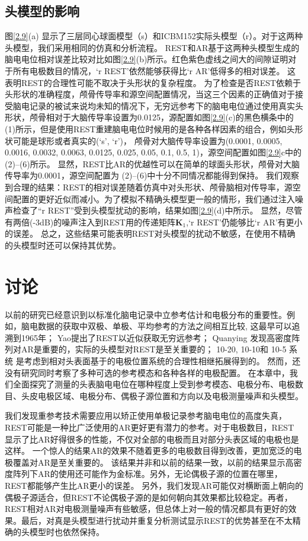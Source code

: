 \subsection{头模型的影响}
\label{ch3.7}
图\ref{2.9}(a) 显示了三层同心球面模型（s）和ICBM152实际头模型（r）。对于这两种头模型，我们采用相同的仿真和分析流程。 REST和AR基于这两种头模型生成的脑电电位相对误差比较对比如图\ref{2.9}(b)所示。红色紫色虚线之间大的间隙证明对于所有电极数目的情况，‘r REST’依然能够获得比‘r AR’低得多的相对误差。
这表明REST的合理性可能不取决于头形状的复杂程度。 为了检查是否REST依赖于头形状的准确程度，颅骨传导率和源空间配置情况，当这三个因素的正确值对于接受脑电记录的被试来说均未知的情况下，无穷远参考下的脑电电位通过使用真实头形状，颅骨相对于大脑传导率设置为0.0125，源配置如图\ref{2.9}(c)的黑色横条中的(1)所示，但是使用REST重建脑电电位时候用的是各种各样因素的组合，例如头形状可能是球形或者真实的(‘s’, ‘r’)， 颅骨对大脑传导率设置为(0.0001, 0.0005, 0.0016, 0.0032, 0.0063, 0.0125, 0.025, 0.05, 0.1, 0.5, 1)，源空间配置如图\ref{2.9}c中的(2)–(6)所示。 显然，REST比AR的优越性可以在简单的球面头形状，颅骨对大脑传导率为0.0001，源空间配置为 (2)–(6)中十分不同情况都能得到保持。 我们观察到合理的结果：REST的相对误差随着仿真中对头形状、颅骨脑相对传导率，源空间配置的更好近似而减小。为了模拟不精确头模型更一般的情形，我们通过注入噪声检查了“r REST”受到头模型扰动的影响，结果如图\ref{2.9}(d)中所示。 显然，尽管有两倍(-3dB)的噪声注入到REST用的传递矩阵$\mathbf{K}_1$,‘r
REST’仍能够比‘r AR’有更小的误差。 总之，这些结果可能表明REST对头模型的扰动不敏感，在使用不精确的头模型时还可以保持其优势。

\section{讨论}
以前的研究已经意识到以标准化脑电记录中立参考估计和电极分布的重要性。例如，脑电数据的获取中双极、单极、平均参考的方法之间相互比较, 这最早可以追溯到1965年； Yao提出了REST以近似获取无穷远参考； Quanying
发现高密度阵列对AR是重要的，实际的头模型对REST是至关重要的； 10-20, 10-10和 10-5 系统 是考虑到相对头表面基于的电极位置系统的合理性相继拓展得到的。 然而，还没有研究同时考察了多种可选的参考模态和各种各样的电极配置。 在本章中，我们全面探究了测量的头表脑电电位在哪种程度上受到参考模态、电极分布、电极数目、头皮电极区域、电极分布、偶极子源位置和方向以及电极测量噪声和头模型。

我们发现重参考技术需要应用以矫正使用单极记录参考脑电电位的高度失真，REST可能是一种比广泛使用的AR更好更有潜力的参考。对于电极数目，REST 显示了比AR好得很多的性能，不仅对全部的电极而且对部分头表区域的电极也是这样。 一个惊人的结果AR的效果不随着更多的电极数目得到改善，更加宽泛的电极覆盖对AR是至关重要的。 该结果并非和以前的结果一致，以前的结果显示高密度阵列下AR的使用还可能作为金标准。另外，无论偶极子源的位置在哪里，REST都能够产生比AR更小的误差。 另外，我们发现AR可能仅对横断面上朝向的偶极子源适合，但REST不论偶极子源的是如何朝向其效果都比较稳定。再者，REST相对AR对电极测量噪声有些敏感，但总体上对一般的情况都具有更好的效果。最后，对真是头模型进行扰动并重复分析测试显示REST的优势甚至在不太精确的头模型时也依然保持。


